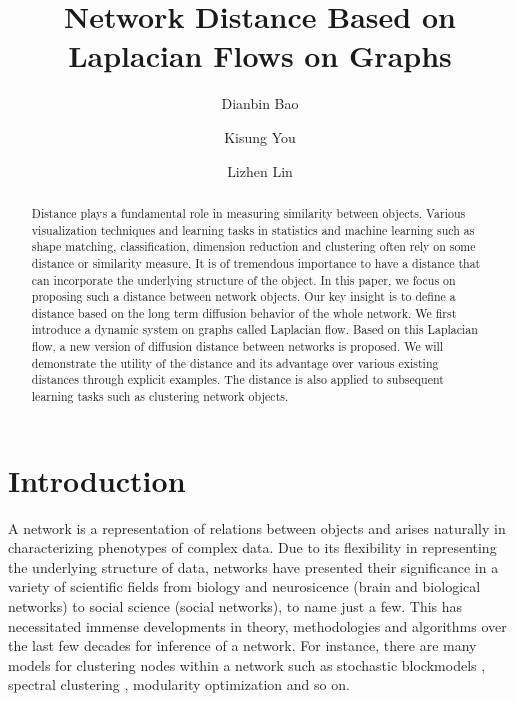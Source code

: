 \documentclass{amsart}
\begin{document}
\title{Network Distance Based on Laplacian Flows on Graphs}
\author{Dianbin Bao}
\address{316 Sutherland Building, 1600 Woodland Road, Abington, PA,19001}


\author{Kisung You}
\address{B02 Hayes-Healy Center,
	Notre Dame, IN 46556-5641}

\author{Lizhen Lin}
\address{Hurley 152A, Notre Dame, IN 46556 }
\begin{abstract}
Distance plays a fundamental role in measuring similarity between objects. Various visualization techniques and learning tasks in statistics and machine learning such as shape matching, classification, dimension reduction and clustering  often rely on some distance or similarity measure. It is of tremendous importance to have a distance that can incorporate the  underlying structure of the object.  In this paper,  we focus on proposing such a distance between network objects.  Our key  insight is to define a distance based on the long term diffusion behavior of the whole network. We first introduce a dynamic system on graphs called Laplacian flow. Based on this Laplacian flow, a new version of diffusion distance between networks is proposed. We will demonstrate the utility of the distance and its advantage over various existing distances through  explicit examples.  The distance  is also applied to subsequent  learning tasks such as clustering network objects.
\end{abstract}

\maketitle
\section{Introduction}

A network is a representation of relations between objects and arises naturally in characterizing phenotypes of complex data. Due to its flexibility in representing the underlying structure of data, networks have presented their significance in a variety of scientific fields from biology and neurosicence (brain and biological  networks) to social science (social networks), to name just a few. This has necessitated immense developments in theory, methodologies and algorithms over the last few decades for inference of a network. For instance, there are many models for clustering  nodes within a network such as stochastic blockmodels \cite{karrer_stochastic_2011, holland_stochastic_1983}, spectral clustering \cite{von_luxburg_tutorial_2007}, modularity optimization \cite{newman_modularity_2006} and so on.
\end{document}
